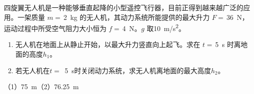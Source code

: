 四旋翼无人机是一种能够垂直起降的小型遥控飞行器，目前正得到越来越广泛的应用。一架质量 $m =$\,\qty{2}{kg} 的无人机，其动力系统所能提供的最大升力 $F = $\,\qty{36}{N}，运动过程中所受空气阻力大小恒为 $f = $\,\qty{4}{N}。$g$ 取\qty{10}{m/s^2}。
\begin{enumerate}
	\item 无人机在地面上从静止开始，以最大升力竖直向上起飞。求在 $t = $\,\qty{5}{s} 时离地面的高度\(h_1\)。
	\item 若无人机在\(t =\) \,\qty{5}{s}时关闭动力系统，求无人机离地面的最大高度\(h_2\)。
\end{enumerate}
\begin{answer}
    （1）\qty{75}{m}（2）\qty{76.25}{m}
\end{answer}